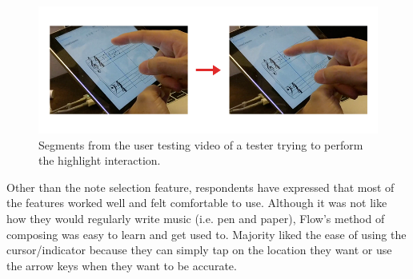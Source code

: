 				\begin{figure}[h]
					\centering
					\includegraphics[scale=0.5]{figures/video_highlight.png}
				    \caption{Segments from the user testing video of a tester trying to perform the highlight interaction.}
				    \label{fig:video_highlight}
				\end{figure}

				Other than the note selection feature, respondents have expressed that most of the features worked well and felt comfortable to use. Although it was not like how they would regularly write music (i.e. pen and paper), Flow's method of composing was easy to learn and get used to. Majority liked the ease of using the cursor/indicator because they can simply tap on the location they want or use the arrow keys when they want to be accurate.

